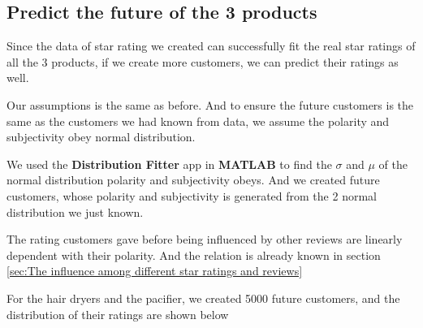 \documentclass[12pt]{article}  %
\begin{document}
\subsection{Predict the future of the 3 products}

Since the data of star rating we created can successfully fit the real star ratings of all the 3 products, if we create more customers, we can predict their ratings as well.

Our assumptions is the same as before. And to ensure the future customers is the same as the customers we had known from data, we assume the polarity and subjectivity obey normal distribution.

We used the \textbf{Distribution Fitter} app in \textbf{MATLAB} to find the $\sigma$ and $\mu$ of the normal distribution polarity and subjectivity obeys. And we created future customers, whose polarity and subjectivity is generated from the 2 normal distribution we just known.

The rating customers gave before being influenced by other reviews are linearly dependent with their polarity. And the relation is already known in section \ref{sec:The influence among different star ratings and reviews}

For the hair dryers and the pacifier, we created 5000 future customers, and the distribution of their ratings are shown below
\end{document}

